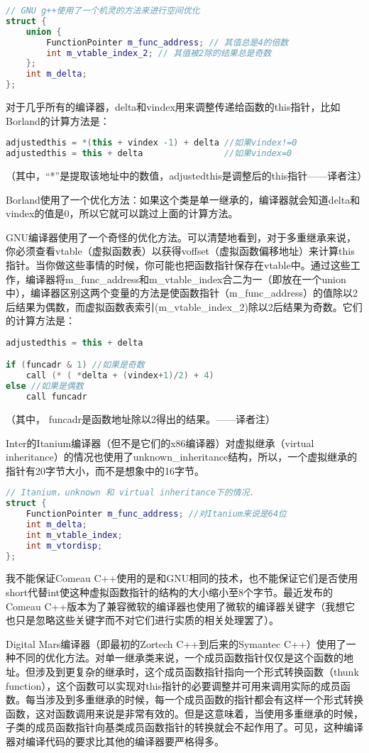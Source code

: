 \documentclass{article}
\begin{document}
\begin{CJK}{UTF8}{gbsn}
\begin{lstlisting}[language=c++]
// GNU g++使用了一个机灵的方法来进行空间优化
struct {
    union {
        FunctionPointer m_func_address; // 其值总是4的倍数
        int m_vtable_index_2; // 其值被2除的结果总是奇数
    };
    int m_delta;
};
\end{lstlisting}
对于几乎所有的编译器，delta和vindex用来调整传递给函数的this指针，比如Borland的计算方法是：
\begin{lstlisting}[language=c++]
adjustedthis = *(this + vindex -1) + delta //如果vindex!=0
adjustedthis = this + delta                //如果vindex=0
\end{lstlisting}
（其中，“*”是提取该地址中的数值，adjustedthis是调整后的this指针——译者注）

Borland使用了一个优化方法：如果这个类是单一继承的，编译器就会知道delta和vindex的值是0，所以它就可以跳过上面的计算方法。

GNU编译器使用了一个奇怪的优化方法。可以清楚地看到，对于多重继承来说，你必须查看vtable（虚拟函数表）以获得voffset（虚拟函数偏移地址）来计算this指针。当你做这些事情的时候，你可能也把函数指针保存在vtable中。通过这些工作，编译器将m\_func\_address和m\_vtable\_index合二为一（即放在一个union中），编译器区别这两个变量的方法是使函数指针（m\_func\_address）的值除以2后结果为偶数，而虚拟函数表索引(m\_vtable\_index\_2)除以2后结果为奇数。它们的计算方法是：
\begin{lstlisting}[language=c++]
adjustedthis = this + delta

if (funcadr & 1) //如果是奇数
    call (* ( *delta + (vindex+1)/2) + 4)
else //如果是偶数
    call funcadr
\end{lstlisting}
（其中， funcadr是函数地址除以2得出的结果。——译者注）

Inter的Itanium编译器（但不是它们的x86编译器）对虚拟继承（virtual inheritance）的情况也使用了unknown\_inheritance结构，所以，一个虚拟继承的指针有20字节大小，而不是想象中的16字节。
\begin{lstlisting}[language=c++]
// Itanium，unknown 和 virtual inheritance下的情况.
struct {
    FunctionPointer m_func_address; //对Itanium来说是64位
    int m_delta;
    int m_vtable_index;
    int m_vtordisp;
};
\end{lstlisting}
我不能保证Comeau C++使用的是和GNU相同的技术，也不能保证它们是否使用short代替int使这种虚拟函数指针的结构的大小缩小至8个字节。最近发布的Comeau C++版本为了兼容微软的编译器也使用了微软的编译器关键字（我想它也只是忽略这些关键字而不对它们进行实质的相关处理罢了）。

Digital Mars编译器（即最初的Zortech C++到后来的Symantec C++）使用了一种不同的优化方法。对单一继承类来说，一个成员函数指针仅仅是这个函数的地址。但涉及到更复杂的继承时，这个成员函数指针指向一个形式转换函数（thunk function），这个函数可以实现对this指针的必要调整并可用来调用实际的成员函数。每当涉及到多重继承的时候，每一个成员函数的指针都会有这样一个形式转换函数，这对函数调用来说是非常有效的。但是这意味着，当使用多重继承的时候，子类的成员函数指针向基类成员函数指针的转换就会不起作用了。可见，这种编译器对编译代码的要求比其他的编译器要严格得多。


\end{CJK}
\end{document}
